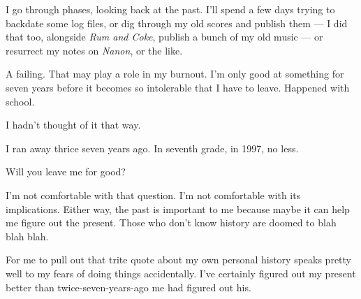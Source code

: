 
I go through phases, looking back at the past. I'll spend a few days trying to backdate some log files, or dig through my old scores and publish them --- I did that too, alongside \emph{Rum and Coke}, publish a bunch of my old music --- or resurrect my notes on \emph{Nanon}, or the like.


A failing. That may play a role in my burnout. I'm only good at something for seven years before it becomes so intolerable that I have to leave. Happened with school.


I hadn't thought of it that way.


I ran away thrice seven years ago. In seventh grade, in 1997, no less.


Will you leave me for good?


I'm not comfortable with that question. I'm not comfortable with its implications. Either way, the past is important to me because maybe it can help me figure out the present. Those who don't know history are doomed to blah blah blah.


For me to pull out that trite quote about my own personal history speaks pretty well to my fears of doing things accidentally. I've certainly figured out my present better than twice-seven-years-ago me had figured out his.

\newpage
